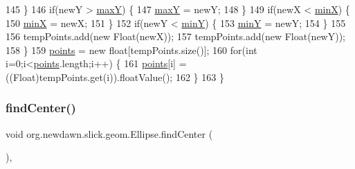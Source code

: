 \begin{DoxyCode}
145             \}
146             \textcolor{keywordflow}{if}(newY > \mbox{\hyperlink{classorg_1_1newdawn_1_1slick_1_1geom_1_1_shape_aaacbabfb1b7d0653f59658d92ded1c2b}{maxY}}) \{
147                 \mbox{\hyperlink{classorg_1_1newdawn_1_1slick_1_1geom_1_1_shape_aaacbabfb1b7d0653f59658d92ded1c2b}{maxY}} = newY;
148             \}
149             \textcolor{keywordflow}{if}(newX < \mbox{\hyperlink{classorg_1_1newdawn_1_1slick_1_1geom_1_1_shape_a5bd07629e85d4a15fc03e3d60edb7c03}{minX}}) \{
150                 \mbox{\hyperlink{classorg_1_1newdawn_1_1slick_1_1geom_1_1_shape_a5bd07629e85d4a15fc03e3d60edb7c03}{minX}} = newX;
151             \}
152             \textcolor{keywordflow}{if}(newY < \mbox{\hyperlink{classorg_1_1newdawn_1_1slick_1_1geom_1_1_shape_a4794592d5238a8c51d9d8ac4a11e68d4}{minY}}) \{
153                 \mbox{\hyperlink{classorg_1_1newdawn_1_1slick_1_1geom_1_1_shape_a4794592d5238a8c51d9d8ac4a11e68d4}{minY}} = newY;
154             \}
155             
156             tempPoints.add(\textcolor{keyword}{new} Float(newX));
157             tempPoints.add(\textcolor{keyword}{new} Float(newY));
158         \}
159         \mbox{\hyperlink{classorg_1_1newdawn_1_1slick_1_1geom_1_1_shape_a8b4d4058734bbb3b96072e470b92aa37}{points}} = \textcolor{keyword}{new} \textcolor{keywordtype}{float}[tempPoints.size()];
160         \textcolor{keywordflow}{for}(\textcolor{keywordtype}{int} i=0;i<\mbox{\hyperlink{classorg_1_1newdawn_1_1slick_1_1geom_1_1_shape_a8b4d4058734bbb3b96072e470b92aa37}{points}}.length;i++) \{
161             \mbox{\hyperlink{classorg_1_1newdawn_1_1slick_1_1geom_1_1_shape_a8b4d4058734bbb3b96072e470b92aa37}{points}}[i] = ((Float)tempPoints.get(i)).floatValue();
162         \}
163     \}
\end{DoxyCode}
\mbox{\label{classorg_1_1newdawn_1_1slick_1_1geom_1_1_ellipse_a89903a1b75e22f6c308640cc2c05e252}} 
\subsubsection{\texorpdfstring{find\+Center()}{findCenter()}}
{\footnotesize\ttfamily void org.\+newdawn.\+slick.\+geom.\+Ellipse.\+find\+Center (\begin{DoxyParamCaption}{ }\end{DoxyParamCaption})\hspace{0.3cm}{\ttfamily [inline]}, {\ttfamily [protected]}}

